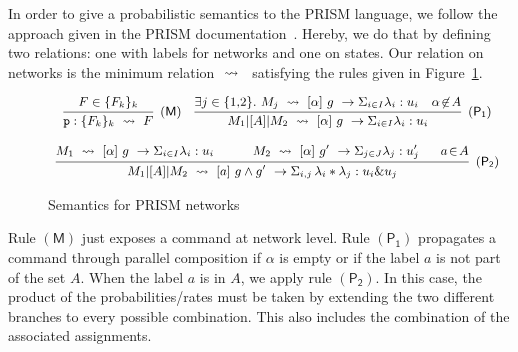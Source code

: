  In order to give a probabilistic semantics to the
PRISM language, we follow the approach given in the PRISM
documentation~\cite{PRISMdoc}.  Hereby, we do that by defining two
relations: one with labels for networks and one on states. Our
relation on networks is the minimum relation $\ \stackrel{}{\rightsquigarrow}\ {}$
satisfying the rules given in Figure~\ref{fig:semantics}.
% 
\begin{figure}[h]
  \begin{displaymath}\small
    \begin{array}{ccc}
      \infer[\mathsf{(M)}]
      { {\role{p}:\{F_k\}_k} \prismred{} F
      }
      {
      F\in\{F_k\}_k
      }
      \quad
      \infer[\mathsf{(P_1)}]
      {M_1\ppp A M_2\prismred{}\command {\alpha}g\lambda u
      }
      {
      \exists j\in\{1,\!2\}.\ 
      M_j\prismred{} \command {\alpha}g\lambda u
      & \alpha\!\not\in\! A
        }
      \\\\
      \infer[\mathsf{(P_2)}]
      {M_1\ppp A M_2\prismred{}
      \commandBase a{g\land g'}
      {\Sigma_{i,j}\,\lambda_i*\lambda_j}: {u_i\& u_j} 
      }
      {
      M_1\prismred{}\command {\alpha}g\lambda u
      \quad&\quad 
        M_2\prismred{}\commandBase {\alpha} {g'} \Sigma_{j\in J}\lambda_j: u'_j
      \ &\
             a\!\in\! A}
    \end{array}
  \end{displaymath}
  \caption{Semantics for PRISM networks} 
  \label{fig:semantics}
\end{figure}
Rule $\mathsf{(M)}$ just exposes a command at network level. Rule
$\mathsf{(P_1)}$ propagates a command through parallel composition if
$\alpha$ is empty or if the label $a$ is not part of the set $A$. When
the label $a$ is in $A$, we apply rule $\mathsf{(P_2)}$. In this case,
the product of the probabilities/rates must be taken by extending the
two different branches to every possible combination. This also
includes the combination of the associated assignments.

